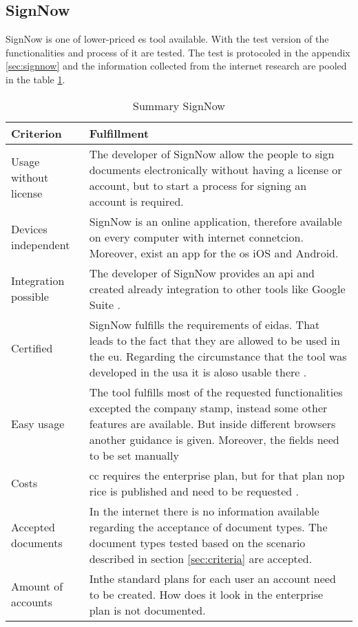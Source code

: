 \subsection{SignNow}
SignNow is one of lower-priced \gls{es} tool available. With the test version of the functionalities and process of it are tested. The test is protocoled in the appendix \ref{sec:signnow} and the information collected from the internet research are pooled in the table \ref{tab:signnow}.
\begin{table}[h!]
	\begin{tabular}{|p{4cm}|p{10cm}|} \hline
		Criterion & Fulfillment \\ \hline
		Usage without license & The developer of SignNow allow the people to sign documents electronically without having a license or account, but to start a process for signing an account is required.\\ \hline
		Devices independent & SignNow is an online application, therefore available on every computer with internet connetcion. Moreover, exist an \gls{app} for the \gls{os} iOS and Android. \\ \hline
		Integration possible & The developer of SignNow provides an \gls{api} and created already integration to other tools like Google Suite \parencite{signnow2018enterprise,signnow2018price}. \\ \hline
		Certified & SignNow fulfills the requirements of \gls{eidas}. That leads to the fact that they are allowed to be used in the \gls{eu}. Regarding the circumstance that the tool was developed in the \gls{usa} it is aloso usable there \parencite{signnow2018legal}. \\ \hline
		Easy usage & The tool fulfills most of the requested functionalities excepted the company stamp, instead some other features are available. But inside different browsers another guidance is given. Moreover, the fields need to be set manually
		\\ \hline
		Costs & \Gls{cc} requires the enterprise plan, but for that plan nop rice is published and need to be requested \parencite{signnow2018price}. \\ \hline
		Accepted documents & In the internet there is no information available regarding the acceptance of document types. The document types tested based on the scenario described in section \ref{sec:criteria} are accepted.\\ \hline
		Amount of accounts & Inthe standard plans for each user an account need to be created. How does it look in the enterprise plan is not documented. \\ \hline
	\end{tabular}
	\caption{Summary SignNow}
	\label{tab:signnow}
\end{table}

